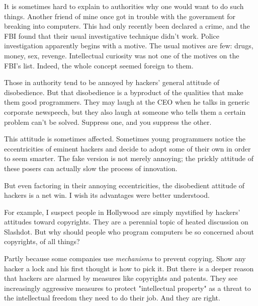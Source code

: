 It is sometimes hard to explain to
                  authorities why one would want to do such things. Another
                  friend of mine once got in trouble with the government for
                  breaking into computers. This had only recently been declared
                  a crime, and the FBI found that their usual investigative
                  technique didn't work. Police investigation apparently begins
                  with a motive. The usual motives are few: drugs, money, sex,
                  revenge. Intellectual curiosity was not one of the motives on
                  the FBI's list. Indeed, the whole concept seemed foreign to
                  them.

Those in authority tend to be annoyed by
                  hackers' general attitude of disobedience. But that
                  disobedience is a byproduct of the qualities that make them
                  good programmers. They may laugh at the CEO when he talks in
                  generic corporate newspeech, but they also laugh at someone
                  who tells them a certain problem can't be solved. Suppress
                  one, and you suppress the other.

This attitude is
                  sometimes affected. Sometimes young programmers notice the
                  eccentricities of eminent hackers and decide to adopt some of
                  their own in order to seem smarter. The fake version is not
                  merely annoying; the prickly attitude of these posers can
                  actually slow the process of innovation.

But even
                  factoring in their annoying eccentricities, the disobedient
                  attitude of hackers is a net win. I wish its advantages were
                  better understood.

For example, I suspect people in
                  Hollywood are simply mystified by hackers' attitudes toward
                  copyrights. They are a perennial topic of heated discussion on
                  Slashdot. But why should people who program computers be so
                  concerned about copyrights, of all things?

Partly
                  because some companies use \emph{mechanisms} to prevent
                  copying. Show any hacker a lock and his first thought is how
                  to pick it. But there is a deeper reason that hackers are
                  alarmed by measures like copyrights and patents. They see
                  increasingly aggressive measures to protect "intellectual
                  property" as a threat to the intellectual freedom they need to
                  do their job. And they are right.

